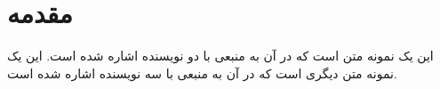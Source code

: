 \documentclass{article}
\begin{document}
	
	\section{مقدمه}	
	این یک نمونه متن است که در آن به منبعی با دو نویسنده
	\parencite{ref1}
	اشاره شده است.	 این یک نمونه متن دیگری است که در آن به منبعی با سه نویسنده
	\parencite{ref2}
	اشاره شده است.
	
	\printbibliography
	
\end{document}
